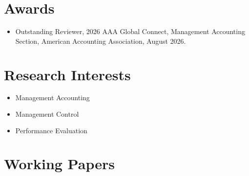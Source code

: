 \documentclass[letterpaper,11pt]{article}
\begin{document}
\section*{Awards}

\begin{itemize}
  \item Outstanding Reviewer, 2026 AAA Global Connect, Management Accounting Section, American Accounting Association, August 2026.
\end{itemize}

\section*{Research Interests}

\begin{itemize}
  \item Management Accounting
  \item Management Control
  \item Performance Evaluation
\end{itemize}

\section*{Working Papers}
\end{document}
